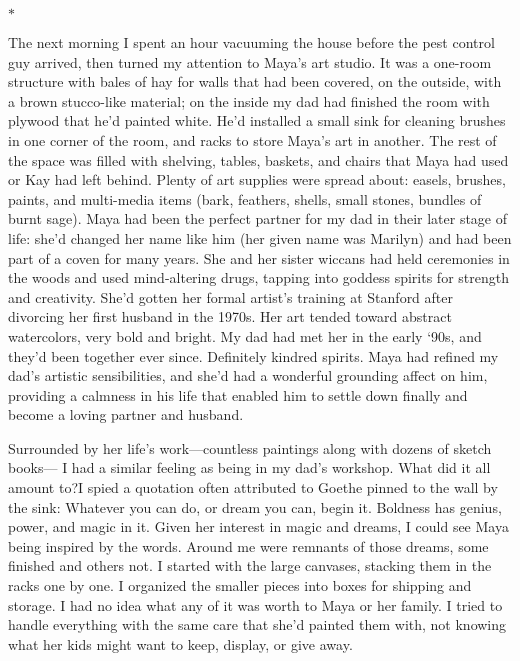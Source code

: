 \documentclass[12pt]{book}
\begin{document}
\begin{center}$*$\end{center}

The next morning I spent an hour vacuuming the house before the pest control guy arrived, then turned my attention to Maya's art studio. It was a one-room structure with bales of hay for walls that had been covered, on the outside, with a brown stucco-like material; on the inside my dad had finished the room with plywood that he'd painted white. He'd installed a small sink for cleaning brushes in one corner of the room, and racks to store Maya's art in another. The rest of the space was filled with shelving, tables, baskets, and chairs that Maya had used or Kay had left behind. Plenty of art supplies were spread about: easels, brushes, paints, and multi-media items (bark, feathers, shells, small stones, bundles of burnt sage). Maya had been the perfect partner for my dad in their later stage of life: she'd changed her name like him (her given name was Marilyn) and had been part of a coven for many years. She and her sister wiccans had held ceremonies in the woods and used mind-altering drugs, tapping into goddess spirits for strength and creativity. She'd gotten her formal artist's training at Stanford after divorcing her first husband in the 1970s. Her art tended toward abstract watercolors, very bold and bright. My dad had met her in the early `90s, and they'd been together ever since. Definitely kindred spirits. Maya had refined my dad's artistic sensibilities, and she'd had a wonderful grounding affect on him, providing a calmness in his life that enabled him to settle down finally and become a loving partner and husband.

Surrounded by her life's work---countless paintings along with dozens of sketch books--- I had a similar feeling as being in my dad's workshop. What did it all amount to?I spied a quotation often attributed to Goethe pinned to the wall by the sink: Whatever you can do, or dream you can, begin it. Boldness has genius, power, and magic in it. Given her interest in magic and dreams, I could see Maya being inspired by the words. Around me were remnants of those dreams, some finished and others not. I started with the large canvases, stacking them in the racks one by one. I organized the smaller pieces into boxes for shipping and storage. I had no idea what any of it was worth to Maya or her family. I tried to handle everything with the same care that she'd painted them with, not knowing what her kids might want to keep, display, or give away.
\end{document}
